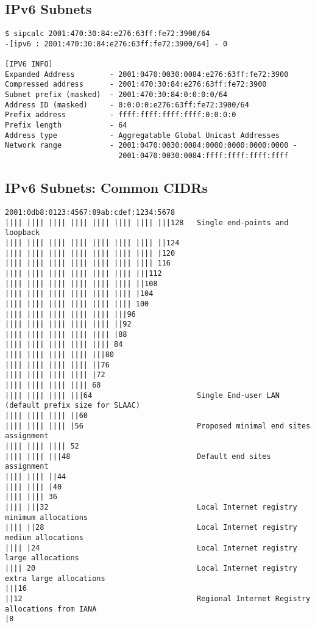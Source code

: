 \documentclass[xga]{xdvislides}
\begin{document}
\subsection{IPv6 Subnets}
\begin{verbatim}
$ sipcalc 2001:470:30:84:e276:63ff:fe72:3900/64
-[ipv6 : 2001:470:30:84:e276:63ff:fe72:3900/64] - 0

[IPV6 INFO]
Expanded Address        - 2001:0470:0030:0084:e276:63ff:fe72:3900
Compressed address      - 2001:470:30:84:e276:63ff:fe72:3900
Subnet prefix (masked)  - 2001:470:30:84:0:0:0:0/64
Address ID (masked)     - 0:0:0:0:e276:63ff:fe72:3900/64
Prefix address          - ffff:ffff:ffff:ffff:0:0:0:0
Prefix length           - 64
Address type            - Aggregatable Global Unicast Addresses
Network range           - 2001:0470:0030:0084:0000:0000:0000:0000 -
                          2001:0470:0030:0084:ffff:ffff:ffff:ffff

\end{verbatim}

\subsection{IPv6 Subnets: Common CIDRs}
\small
\begin{verbatim}
2001:0db8:0123:4567:89ab:cdef:1234:5678
|||| |||| |||| |||| |||| |||| |||| |||128   Single end-points and loopback
|||| |||| |||| |||| |||| |||| |||| ||124
|||| |||| |||| |||| |||| |||| |||| |120
|||| |||| |||| |||| |||| |||| |||| 116
|||| |||| |||| |||| |||| |||| |||112
|||| |||| |||| |||| |||| |||| ||108
|||| |||| |||| |||| |||| |||| |104
|||| |||| |||| |||| |||| |||| 100
|||| |||| |||| |||| |||| |||96
|||| |||| |||| |||| |||| ||92
|||| |||| |||| |||| |||| |88
|||| |||| |||| |||| |||| 84
|||| |||| |||| |||| |||80
|||| |||| |||| |||| ||76
|||| |||| |||| |||| |72
|||| |||| |||| |||| 68
|||| |||| |||| |||64                        Single End-user LAN (default prefix size for SLAAC)
|||| |||| |||| ||60
|||| |||| |||| |56                          Proposed minimal end sites assignment
|||| |||| |||| 52
|||| |||| |||48                             Default end sites assignment
|||| |||| ||44
|||| |||| |40
|||| |||| 36
|||| |||32                                  Local Internet registry minimum allocations
|||| ||28                                   Local Internet registry medium allocations
|||| |24                                    Local Internet registry large allocations
|||| 20                                     Local Internet registry extra large allocations
|||16
||12                                        Regional Internet Registry allocations from IANA
|8
\end{verbatim}
\Normalsize
\end{document}
